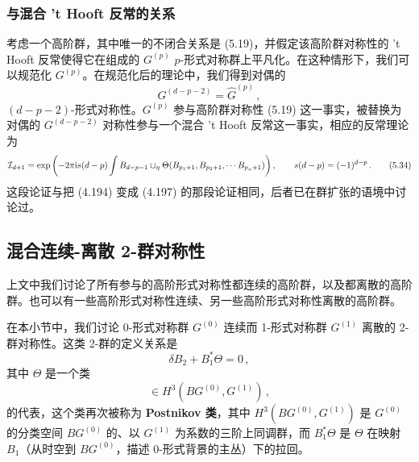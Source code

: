 
\subsubsection{与混合 't Hooft 反常的关系}

考虑一个高阶群，其中唯一的不闭合关系是 (5.19)，并假定该高阶群对称性的 't Hooft 反常使得它在组成的 $G^{(p)}$ $p$-形式对称群上平凡化。在这种情形下，我们可以规范化 $G^{(p)}$。在规范化后的理论中，我们得到对偶的
\begin{equation}
  G^{(d-p-2)}=\widehat{G}^{(p)}\,, \tag{5.33}
\end{equation}
$(d-p-2)$-形式对称性。$G^{(p)}$ 参与高阶群对称性 (5.19) 这一事实，被替换为对偶的 $G^{(d-p-2)}$ 对称性参与一个混合 't Hooft 反常这一事实，相应的反常理论为
\begin{equation}
  \mathcal{I}_{d+1}=\exp\left(-2\pi\mathrm{i} s(d-p)\int B_{d-p-1}\cup_\eta\Theta(B_{p_1+1},B_{p_2+1},\cdots B_{p_n+1})\right),\qquad
  s(d-p)=(-1)^{d-p}\,. \tag{5.34}
\end{equation}
这段论证与把 (4.194) 变成 (4.197) 的那段论证相同，后者已在群扩张的语境中讨论过。


\subsection{混合连续-离散 2-群对称性}

上文中我们讨论了所有参与的高阶形式对称性都连续的高阶群，以及都离散的高阶群。也可以有一些高阶形式对称性连续、另一些高阶形式对称性离散的高阶群。

在本小节中，我们讨论 0-形式对称群 $G^{(0)}$ 连续而 1-形式对称群 $G^{(1)}$ 离散的 2-群对称性。这类 2-群的定义关系是
\begin{equation}
  \delta B_2+B_1^*\Theta=0\,, \tag{5.35}
\end{equation}
其中 $\Theta$ 是一个类
\begin{equation}
  [\Theta]\in H^3(BG^{(0)},G^{(1)})\,, \tag{5.36}
\end{equation}
的代表，这个类再次被称为 \textbf{Postnikov 类}，其中 $H^3(BG^{(0)},G^{(1)})$ 是 $G^{(0)}$ 的分类空间 $BG^{(0)}$ 的、以 $G^{(1)}$ 为系数的三阶上同调群，而 $B_1^*\Theta$ 是 $\Theta$ 在映射 $B_1$（从时空到 $BG^{(0)}$，描述 0-形式背景的主丛）下的拉回。

